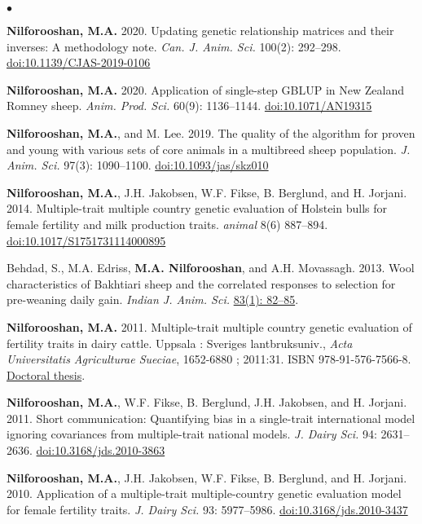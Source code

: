 \documentclass[margin,line]{res}
\newenvironment{list2}{
  \begin{list}{$\bullet$}{%
      \setlength{\itemsep}{0in}
      \setlength{\parsep}{0in} \setlength{\parskip}{0in}
      \setlength{\topsep}{0in} \setlength{\partopsep}{0in}
      \setlength{\leftmargin}{0.2in}}}{\end{list}}
\begin{document}
\begin{resume}
\begin{list2}
\item {\bf Nilforooshan, M.A.} 2020. Updating genetic relationship matrices and their inverses: A methodology note. {\em Can. J. Anim. Sci.} 100(2): 292--298. \href{https://doi.org/10.1139/CJAS-2019-0106}{doi:10.1139/CJAS-2019-0106}
\item {\bf Nilforooshan, M.A.} 2020. Application of single-step GBLUP in New Zealand Romney sheep. {\em Anim. Prod. Sci.} 60(9): 1136--1144. \href{https://doi.org/10.1071/AN19315}{doi:10.1071/AN19315}
\item {\bf Nilforooshan, M.A.}, and M. Lee. 2019. The quality of the algorithm for proven and young with various sets of core animals in a multibreed sheep population. {\em J. Anim. Sci.} 97(3): 1090--1100. \href{https://doi.org/10.1093/jas/skz010}{doi:10.1093/jas/skz010}
\item {\bf Nilforooshan, M.A.}, J.H. Jakobsen, W.F. Fikse, B. Berglund, and H. Jorjani. 2014. Multiple-trait multiple country genetic evaluation of Holstein bulls for female fertility and milk production traits. {\em animal} 8(6) 887--894. \href{https://doi.org/10.1017/S1751731114000895}{doi:10.1017/S1751731114000895}
\item Behdad, S., M.A. Edriss, {\bf M.A. Nilforooshan}, and A.H. Movassagh. 2013. Wool characteristics of Bakhtiari sheep and the correlated responses to selection for pre-weaning daily gain. {\em Indian J. Anim. Sci.} \href{http://epubs.icar.org.in/ejournal/index.php/IJAnS/article/view/26453}{83(1): 82--85}.
\item {\bf Nilforooshan, M.A.} 2011. Multiple-trait multiple country genetic evaluation of fertility traits in dairy cattle. Uppsala : Sveriges lantbruksuniv., {\em Acta Universitatis Agriculturae Sueciae}, 1652-6880 ; 2011:31. ISBN 978-91-576-7566-8. \href{https://pub.epsilon.slu.se/8094}{Doctoral thesis}.
\item {\bf Nilforooshan, M.A.}, W.F. Fikse, B. Berglund, J.H. Jakobsen, and H. Jorjani. 2011. Short communication: Quantifying bias in a single-trait international model ignoring covariances from multiple-trait national models. {\em J. Dairy Sci.} 94: 2631--2636. \href{https://doi.org/10.3168/jds.2010-3863}{doi:10.3168/jds.2010-3863}
\item {\bf Nilforooshan, M.A.}, J.H. Jakobsen, W.F. Fikse, B. Berglund, and H. Jorjani. 2010. Application of a multiple-trait multiple-country genetic evaluation model for female fertility traits. {\em J. Dairy Sci.} 93: 5977--5986. \href{https://doi.org/10.3168/jds.2010-3437}{doi:10.3168/jds.2010-3437}

\end{list2}
\end{resume}
\end{document}
